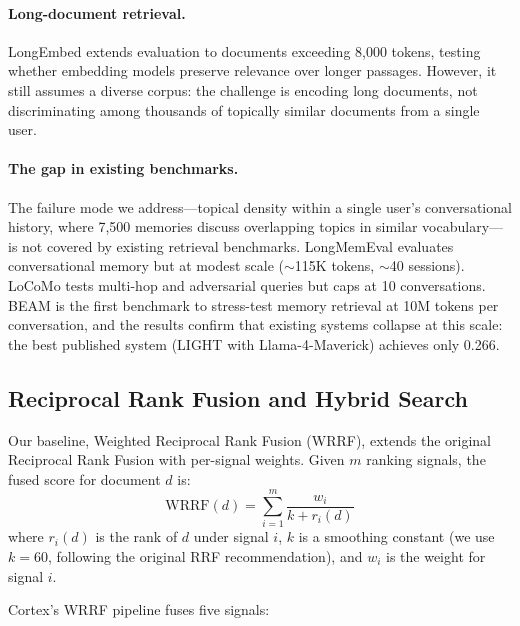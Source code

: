 \documentclass[11pt]{article}
\begin{document}
\paragraph{Long-document retrieval.}
LongEmbed \citep{Zhu2024} extends evaluation to documents exceeding
8,000 tokens, testing whether embedding models preserve relevance
over longer passages.  However, it still assumes a diverse corpus:
the challenge is encoding long documents, not discriminating among
thousands of topically similar documents from a single user.

\paragraph{The gap in existing benchmarks.}
The failure mode we address---topical density within a single user's
conversational history, where 7,500 memories discuss overlapping
topics in similar vocabulary---is not covered by existing retrieval
benchmarks.  LongMemEval \citep{Wu2025} evaluates conversational
memory but at modest scale ($\sim$115K tokens, $\sim$40 sessions).
LoCoMo \citep{Maharana2024} tests multi-hop and adversarial queries
but caps at 10 conversations.  BEAM is the first benchmark to
stress-test memory retrieval at 10M tokens per conversation, and
the results confirm that existing systems collapse at this scale:
the best published system (LIGHT with Llama-4-Maverick) achieves
only 0.266.

\subsection{Reciprocal Rank Fusion and Hybrid Search}
\label{sec:rrf}

Our baseline, Weighted Reciprocal Rank Fusion (WRRF), extends the
original Reciprocal Rank Fusion \citep{Cormack2009} with per-signal
weights.  Given $m$ ranking signals, the fused score for document $d$
is:
\begin{equation}
\text{WRRF}(d) = \sum_{i=1}^{m} \frac{w_i}{k + r_i(d)}
\label{eq:wrrf}
\end{equation}
where $r_i(d)$ is the rank of $d$ under signal $i$, $k$ is a
smoothing constant (we use $k = 60$, following the original RRF
recommendation), and $w_i$ is the weight for signal $i$.

Cortex's WRRF pipeline fuses five signals:
\end{document}
